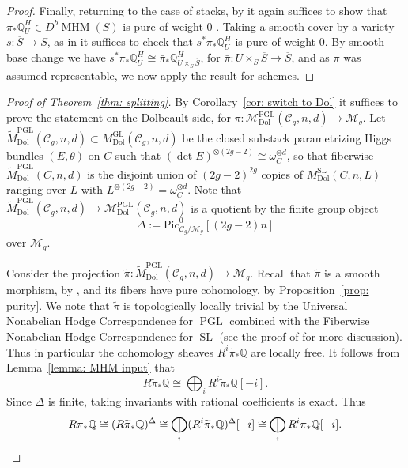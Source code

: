 \documentclass[11pt,reqno]{amsart}
\theoremstyle{plain} %
\theoremstyle{definition}
\newcommand{\QQ}{\mathbb{Q}}
\newcommand{\M}{\mathcal{M}}
\newcommand{\C}{\mathcal{C}}
\DeclareMathOperator{\GL}{GL}
\DeclareMathOperator{\SL}{SL}
\DeclareMathOperator{\PGL}{PGL}
\DeclareMathOperator{\MHM}{MHM}
\newcommand{\Dol}{\mathrm{Dol}}
\newcommand{\Pic}{\mathrm{Pic}}
\begin{document}
\begin{proof}
    Finally, returning to the case of stacks, by \cite[Corollary 3.24]{Tubach} it again suffices to show that $\pi_* \QQ^H_U \in D^b \MHM(S)$ is pure of weight 0 \cite[Definition 3.19]{Tubach}. Taking a smooth cover by a variety $s:\overline{S} \to S$, as in \cite[Proof of Proposition 3.21]{Tubach} it suffices to check that $s^* \pi_* \QQ^H_U$ is pure of weight 0. By smooth base change \cite[Theorem 3.1(4)]{Tubach} we have $s^* \pi_* \QQ^H_U \cong \bar{\pi}_* \QQ^H_{U \times_S \overline{S}}$, for $\bar{\pi}: U \times_S \overline{S} \to \overline{S}$, and as $\pi$ was assumed representable, we now apply the result for schemes.
\end{proof}

\begin{proof}[Proof of Theorem~\ref{thm: splitting}]
	By Corollary~\ref{cor: switch to Dol} it suffices to prove the statement on the Dolbeault side, for $\pi \colon \M_{\Dol}^{\PGL}(\C_g,n,d) \to \M_g$. Let $\widetilde{M}_{\Dol}^{\PGL}(\C_g, n,d) \subset M_{\Dol}^{\GL}(\C_g,n,d)$ be the closed substack parametrizing Higgs bundles $(E, \theta)$ on $C$ such that $(\det E)^{\otimes (2g-2)} \cong \omega_C^{\otimes d}$, so that fiberwise $\widetilde{M}_{\Dol}^{\PGL}(C,n,d)$ is the disjoint union of $(2g-2)^{2g}$ copies of $M_{\Dol}^{\SL}(C,n,L)$ ranging over $L$ with $L^{\otimes (2g-2)} = \omega_C^{\otimes d}$. Note that $\widetilde{M}_{\Dol}^{\PGL}(\C_g,n,d) \to \M_{\Dol}^{\PGL}(\C_g,n,d)$ is a quotient by the finite group object
    \[ 
    \Delta:=\Pic_{\C_g/\M_g}^0[(2g-2)n]
    \]
    over $\M_g$.

    Consider the projection $\widetilde\pi: \widetilde{M}_{\Dol}^{\PGL}(\C_g,n,d) \to \M_g$. Recall that $\widetilde\pi$ is a smooth morphism, by \cite[Proposition 7.4]{Nitsure}, and its fibers have pure cohomology, by   Proposition~\ref{prop: purity}. We note that $\widetilde\pi$ is topologically locally trivial by the Universal Nonabelian Hodge Correspondence for $\PGL$ combined with the Fiberwise Nonabelian Hodge Correspondence for $\SL$ (see the proof of \cite[Proposition 3.6]{SLmonodromy} for more discussion). Thus in particular the cohomology sheaves $R^i \widetilde\pi_* \QQ$ are locally free. It follows from Lemma~\ref{lemma: MHM input} that
    \[
    R\widetilde\pi_*\QQ \cong \bigoplus_i R^i\widetilde\pi_*\QQ[-i].
    \]
    Since $\Delta$ is finite, taking invariants with rational coefficients is exact. Thus
    \[
    R\pi_*\QQ
    \cong (R\widetilde\pi_*\QQ)^\Delta
    \cong \bigoplus_i (R^i\widetilde\pi_*\QQ)^\Delta[-i]
    \cong \bigoplus_i R^i\pi_*\QQ[-i]. \qedhere
    \]
\end{proof}
\end{document}
